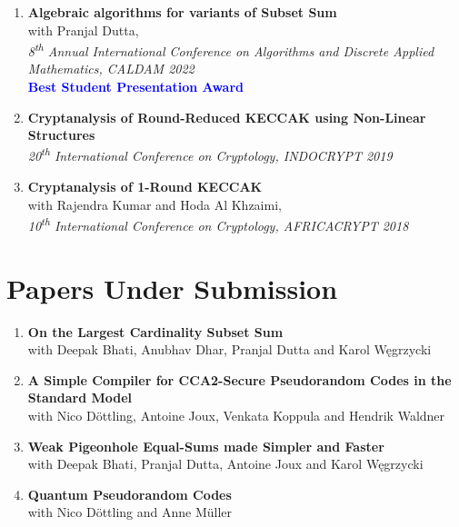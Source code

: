 \documentclass[margin]{res} %
\begin{document}
\begin{resume}
\begin{enumerate}
\item \textbf{Algebraic algorithms for variants of Subset Sum}\\
with Pranjal Dutta,\\
\emph{8\textsuperscript{th}  Annual International Conference on Algorithms and Discrete Applied Mathematics, CALDAM 2022}\\
\textbf{\textcolor{blue}{Best Student Presentation Award}}

\item \textbf{Cryptanalysis of Round-Reduced KECCAK using Non-Linear Structures}\\
\emph{20\textsuperscript{th} International Conference on Cryptology, INDOCRYPT 2019}

\item \textbf{Cryptanalysis of 1-Round KECCAK}\\
with Rajendra Kumar and Hoda Al Khzaimi,\\
\emph{10\textsuperscript{th} International Conference on Cryptology, AFRICACRYPT 2018}

\end{enumerate}



\section{Papers Under Submission}

\begin{enumerate}
\item \textbf{On the Largest Cardinality Subset Sum}\\
with Deepak Bhati, Anubhav Dhar, Pranjal Dutta and Karol W\k{e}grzycki

\item \textbf{A Simple Compiler for CCA2-Secure Pseudorandom Codes in the Standard Model}\\
with Nico Döttling, Antoine Joux, Venkata Koppula and Hendrik Waldner

\item \textbf{Weak Pigeonhole Equal-Sums made Simpler and Faster}\\
with Deepak Bhati, Pranjal Dutta, Antoine Joux and Karol W\k{e}grzycki

\item \textbf{Quantum Pseudorandom Codes}\\
with Nico Döttling and Anne Müller

\end{enumerate}





\end{resume}
\end{document}
